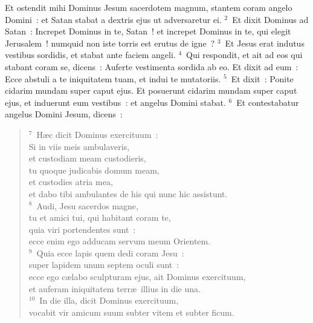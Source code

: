 \bchapter
\lettrine[lines=3,image=true,loversize=0.05,lraise=-0.03]{E}{}t ostendit mihi Dominus Jesum sacerdotem magnum, stantem coram angelo Domini~: et Satan stabat a dextris ejus ut adversaretur ei.
${}^{2}$~Et dixit Dominus ad Satan~: Increpet Dominus in te, Satan~! et increpet Dominus in te, qui elegit Jerusalem~! numquid non iste torris est erutus de igne~?
${}^{3}$~Et Jesus erat indutus vestibus sordidis, et stabat ante faciem angeli.
${}^{4}$~Qui respondit, et ait ad eos qui stabant coram se, dicens~: Auferte vestimenta sordida ab eo. Et dixit ad eum~: Ecce abstuli a te iniquitatem tuam, et indui te mutatoriis.
${}^{5}$~Et dixit~: Ponite cidarim mundam super caput ejus. Et posuerunt cidarim mundam super caput ejus, et induerunt eum vestibus~: et angelus Domini stabat.
${}^{6}$~Et contestabatur angelus Domini Jesum, dicens~:
\begin{flushleft}\begin{verse}${}^{7}$~H\ae c dicit Dominus exercituum~:\\ Si in viis meis ambulaveris,\\ et custodiam meam custodieris,\\ tu quoque judicabis domum meam,\\ et custodies atria mea,\\ et dabo tibi ambulantes de his qui nunc hic assistunt.\\
${}^{8}$~Audi, Jesu sacerdos magne,\\ tu et amici tui, qui habitant coram te,\\ quia viri portendentes sunt~:\\ ecce enim ego adducam servum meum Orientem.\\
${}^{9}$~Quia ecce lapis quem dedi coram Jesu~:\\ super lapidem unum septem oculi sunt~:\\ ecce ego c\ae labo sculpturam ejus, ait Dominus exercituum,\\ et auferam iniquitatem terr\ae\ illius in die una.\\
${}^{10}$~In die illa, dicit Dominus exercituum,\\ vocabit vir amicum suum subter vitem et subter ficum.\end{verse}\end{flushleft}



